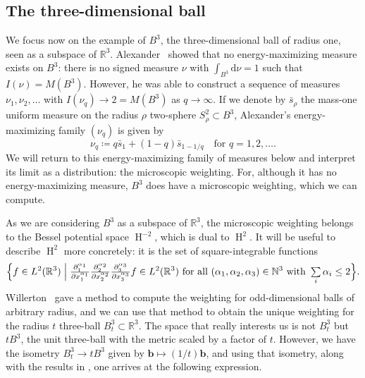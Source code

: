 \documentclass[a4paper, oneside, reqno]{amsart}
\theoremstyle{definition}
\theoremstyle{remark}
\numberwithin{equation}{section}
\renewcommand{\vec}{\mathbf}
\newcommand{\R}{\mathbb{R}}
\newcommand{\dd}{\mathrm{d}} %
\DeclareMathOperator{\besselspace}{H}
\begin{document}

\subsection{The three-dimensional ball}
\label{sec:three-ball}

We focus now on the example of \(B^3\), the three-dimensional ball of radius one, seen as a subspace of \(\R^3\). Alexander~\cite{Alexander:two-problems} showed that no energy-maximizing measure exists on \(B^3\): there is no signed measure \(\nu\) with \(\int_{B^3} \dd\nu =1\) such that \(I(\nu)= M(B^3)\). However, he was able to construct a sequence of measures \(\nu_1, \nu_2, \dots\) with \(I(\nu_q) \to 2 = M(B^3)\) as \(q \to \infty\). If we denote by \(\bar{s}_\rho\) the mass-one uniform measure on the radius \(\rho\) two-sphere \(S^2_\rho \subset B^3\), Alexander's energy-maximizing family \((\nu_q)\) is given by
\begin{equation}
\label{eq:Alexander-family}
    \nu_q \coloneq q \bar{s}_1 + (1 - q) \bar{s}_{1-1/q}
    \quad
    \text{for }
    q = 1, 2, \dots.
\end{equation}
We will return to this energy-maximizing family of measures below and interpret its limit as a distribution: the microscopic weighting. For, although it has no energy-maximizing measure, \(B^3\) does have a microscopic weighting, which we can compute.

As we are considering \(B^3\) as a subspace of \(\R^3\), the microscopic weighting belongs to the Bessel potential space \(\besselspace^{-2}\), which is dual to \(\besselspace^{2}\). It will be useful to describe \(\besselspace^{2}\) more concretely: it is the set of square-integrable functions
\[
    \Bigl\{
        f \in L^2(\R^3) 
        \Bigm|
        \tfrac{\partial_1^{\alpha_1}}{\partial x_1^{\alpha_1}} 
        \tfrac{\partial_2^{\alpha_2}}{\partial x_2^{\alpha_2}} 
        \tfrac{\partial_3^{\alpha_3}}{\partial x_3^{\alpha_3}} 
        f \in L^2(\R^3) 
        \text{ for all } 
        (\alpha_1,\alpha_2,\alpha_3) \in \mathbb{N}^3 
        \text{ with } 
        \textstyle\sum\limits_i \alpha_i \leq 2 
    \Bigr\}
    .
\]
Willerton~\cite{Willerton:odd-balls} gave a method to compute the weighting for odd-dimensional balls of arbitrary radius, and we can use that method to obtain the unique weighting for the radius \(t\) three-ball \(B^3_t \subset \R^3\). The space that really interests us is not \(B^3_t\) but \(t B^3\), the unit three-ball with the metric scaled by a factor of \(t\). However, we have the isometry \(B^3_t \to t B^3\) given by \(\vec{b} \mapsto (1/t)\vec{b}\), and using that isometry, along with the results in \cite{Willerton:odd-balls}, one arrives at the following expression.
\end{document}
